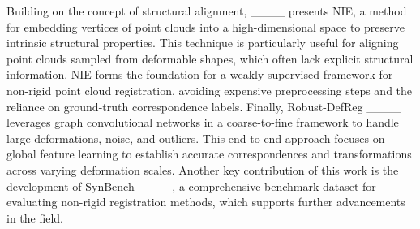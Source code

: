 Building on the concept of structural alignment, ____ presents NIE, a method for embedding vertices of point clouds into a high-dimensional space to preserve intrinsic structural properties. This technique is particularly useful for aligning point clouds sampled from deformable shapes, which often lack explicit structural information. NIE forms the foundation for a weakly-supervised framework for non-rigid point cloud registration, avoiding expensive preprocessing steps and the reliance on ground-truth correspondence labels. Finally, Robust-DefReg ____ leverages graph convolutional networks in a coarse-to-fine framework to handle large deformations, noise, and outliers. This end-to-end approach focuses on global feature learning to establish accurate correspondences and transformations across varying deformation scales. Another key contribution of this work is the development of SynBench ____, a comprehensive benchmark dataset for evaluating non-rigid registration methods, which supports further advancements in the field.